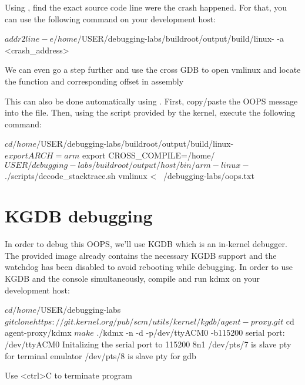 Using , find the exact source code line were the crash happened.
For that, you can use the following command on your development host:

\begin{bashinput}
$ addr2line -e /home/$USER/debugging-labs/buildroot/output/build/linux-%
	-a <crash_address>
\end{bashinput}

We can even go a step further and use the cross GDB to open vmlinux and
locate the function and corresponding offset in assembly


This can also be done automatically using . First,
copy/paste the OOPS message into the  file.
Then, using the script provided by the kernel, execute the following command:

\begin{bashinput}
$ cd /home/$USER/debugging-labs/buildroot/output/build/linux-%
$ export ARCH=arm
$ export CROSS_COMPILE=/home/$USER/debugging-labs/buildroot/output/host/bin/arm-linux-
$ ./scripts/decode_stacktrace.sh vmlinux < ~/debugging-labs/oops.txt
\end{bashinput}

\section{KGDB debugging}
In order to debug this OOPS, we'll use KGDB which is an in-kernel debugger.
The provided image already contains the necessary KGDB support and the watchdog
has been disabled to avoid rebooting while debugging. In order to use KGDB and
the console simultaneously, compile and run kdmx on your development host:

\begin{bashinput}
$ cd /home/$USER/debugging-labs
$ git clone https://git.kernel.org/pub/scm/utils/kernel/kgdb/agent-proxy.git
$ cd agent-proxy/kdmx
$ make
$ ./kdmx -n -d -p/dev/ttyACM0 -b115200
serial port: /dev/ttyACM0
Initalizing the serial port to 115200 8n1
/dev/pts/7 is slave pty for terminal emulator
/dev/pts/8 is slave pty for gdb

Use <ctrl>C to terminate program
\end{bashinput}

